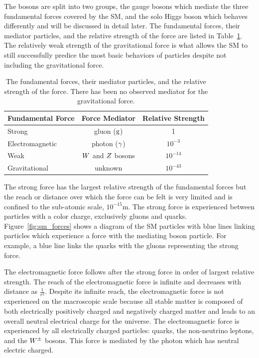 The bosons are split into two groups, the gauge bosons which mediate the three fundamental
forces covered by the SM, and the solo Higgs boson which behaves differently
and will be discussed in detail later. 
The fundamental forces, their mediator particles, and the relative strength of the force
are listed in Table~\ref{tab:sm_forces}. The relatively weak strength of the gravitational
force is what allows the SM to still successfully predice the most basic behaviors
of particles despite not including the gravitational force.

\begin{table}[htbp]
\centering
\begin{tabular}{lcc}
Fundamental Force        &    Force Mediator             & Relative Strength   \\
\hline
Strong                   &    gluon ($\text{g}$)              &   1                 \\ 
Electromagnetic          &    photon ($\gamma$)            &   $10^{-3}$         \\ 
Weak                     &    $W$ and $Z$ bosons     &   $10^{-14}$        \\ 
Gravitational            &    unknown                    &   $10^{-43}$        \\ 
\hline
\end{tabular}
\caption{
The fundamental forces, their mediator particles, and the relative strength of the force.
There has been no observed mediator for the gravitational force.
}
\label{tab:sm_forces}
\end{table}

The strong force has the largest relative strength of the fundamental forces but
the reach or distance over which the force can be felt is very limited and is 
confined to the sub-atomic scale, $10^{-15}$m. The strong force is experienced
between particles with a color charge, exclusively gluons and quarks.
Figure~\ref{fig:sm_forces} shows a diagram of the SM particles with blue
lines linking particles which experience a force with the mediating boson particle.
For example, a blue line links the quarks with the gluons representing the
strong force.

The electromagnetic force follows after the strong force in order of largest relative
strength. The reach of the electromagnetic force is infinite and decreases with
distance as $\frac{1}{r^{2}}$. Despite its infinite reach, the electromagnetic 
force is not experienced on the macroscopic scale because all stable matter is composed
of both electrically positively charged and negatively charged matter and leads to
an overall neutral electrical charge for the universe. The electromagnetic force is experienced by all
electrically charged particles: quarks, the non-neutrino leptons, and the $W^{\pm}$ bosons.
This force is mediated by the photon which has neutral electric charged.

